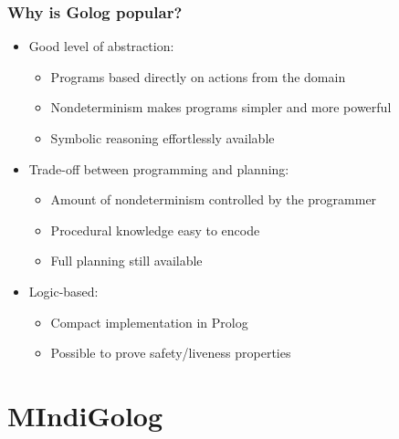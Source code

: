\documentclass{beamer}
\begin{document}
\begin{frame}
\frametitle{Why is Golog popular?}
\begin{itemize}
  \item Good level of abstraction:
  \begin{itemize}
    \item Programs based directly on actions from the domain
    \item Nondeterminism makes programs simpler and more powerful
    \item Symbolic reasoning effortlessly available
  \end{itemize}
  \item Trade-off between programming and planning:
  \begin{itemize}
    \item Amount of nondeterminism controlled by the programmer
    \item Procedural knowledge easy to encode
    \item Full planning still available
  \end{itemize}
  \item Logic-based:
  \begin{itemize}
    \item Compact implementation in Prolog
    \item Possible to prove safety/liveness properties
  \end{itemize}
\end{itemize}
\end{frame}


\section{MIndiGolog}
\end{document}
